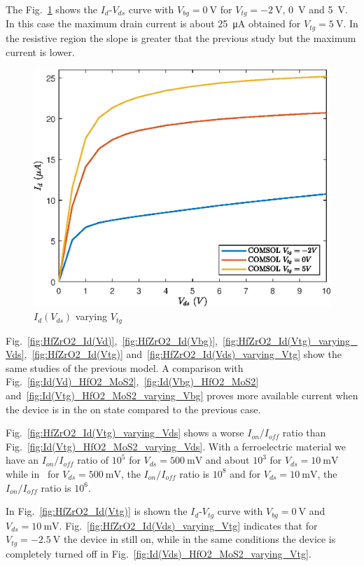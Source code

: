 \documentclass[12pt,a4paper,titlepage]{article}
\begin{document}
The Fig.~\ref{fig:HfZrO2_Id(Vd)_varying_Vtg_high_Vd} shows the $I_d$-$V_{ds}$ curve with $V_{bg} = \SI{0}{\volt}$ for $V_{tg} = \SI{-2}{\volt}$, \SI{0}{\volt} and \SI{5}{\volt}. In this case the maximum drain current is about \SI{25}{\micro \ampere} obtained for $V_{tg} = \SI{5}{\volt}$. In the resistive region the slope is greater that the previous study but the maximum current is lower.

\begin{figure}[h]
	\centering
	\includegraphics[width=.8\textwidth]{Grafici/HfZrO2_Id(Vd)_varying_Vtg_high_Vd.eps} 
	\caption{$I_d(V_{ds})$ varying $V_{tg}$}
	\label{fig:HfZrO2_Id(Vd)_varying_Vtg_high_Vd}
\end{figure} 


Fig.~\ref{fig:HfZrO2_Id(Vd)},~\ref{fig:HfZrO2_Id(Vbg)},~\ref{fig:HfZrO2_Id(Vtg)_varying_Vds},~\ref{fig:HfZrO2_Id(Vtg)} and~\ref{fig:HfZrO2_Id(Vds)_varying_Vtg} show the same studies of the previous model. A comparison with Fig.~\ref{fig:Id(Vd)_HfO2_MoS2},~\ref{fig:Id(Vbg)_HfO2_MoS2} and~\ref{fig:Id(Vtg)_HfO2_MoS2_varying_Vbg} proves more available current when the device is in the on state compared to the previous case.

Fig.~\ref{fig:HfZrO2_Id(Vtg)_varying_Vds} shows a worse $I_{on}/I_{off}$ ratio than Fig.~\ref{fig:Id(Vtg)_HfO2_MoS2_varying_Vds}. With a ferroelectric material we have an $I_{on}/I_{off}$ ratio of $10^5$ for $V_{ds}=\SI{500}{\milli \volt}$ and about $10^3$ for $V_{ds}=\SI{10}{\milli \volt}$ while in~\cite{Radisavljevic:Si_MoS2} for $V_{ds} = \SI{500}{\milli \volt}$, the $I_{on}/I_{off}$ ratio is $10^8$ and for $V_{ds} = \SI{10}{\milli \volt}$, the $I_{on}/I_{off}$ ratio is $10^6$.

In Fig.~\ref{fig:HfZrO2_Id(Vtg)} is shown the $I_d$-$V_{tg}$ curve with $V_{bg}=\SI{0}{\volt}$ and $V_{ds} = \SI{10}{\milli \volt}$.
Fig.~\ref{fig:HfZrO2_Id(Vds)_varying_Vtg} indicates that for $V_{tg} = \SI{-2.5}{\volt}$ the device in still on, while in the same conditions the device is completely turned off in Fig.~\ref{fig:Id(Vds)_HfO2_MoS2_varying_Vtg}.
\end{document}
